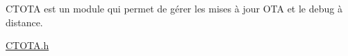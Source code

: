 CTOTA est un module qui permet de gérer les mises à jour OTA et le debug à distance.

\mbox{\hyperlink{_c_t_o_t_a_8h}{CTOTA.\+h}} 